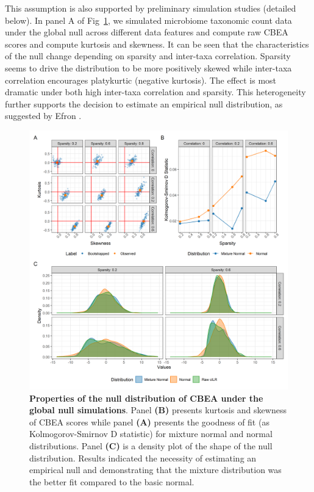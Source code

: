 \documentclass[10pt,letterpaper]{article}
\begin{document}
This assumption is also supported by preliminary simulation studies (detailed below). In panel A of Fig~\ref{fig:1}, we simulated microbiome taxonomic count data under the global null across different data features and compute raw CBEA scores and compute kurtosis and skewness. It can be seen that the characteristics of the null change depending on sparsity and inter-taxa correlation. Sparsity seems to drive the distribution to be more positively skewed while inter-taxa correlation encourages platykurtic (negative kurtosis). The effect is most dramatic under both high inter-taxa correlation and sparsity. This heterogeneity further supports the decision to estimate an empirical null distribution, as suggested by Efron \cite{efron2004}. 

\begin{figure} [!h]
    \centering
    \includegraphics[width=\linewidth]{figures/kurtosis_skewness_gof.png}
    \caption{{\bf Properties of the null distribution of CBEA under the global null simulations}. Panel \textbf{(B)} presents kurtosis and skewness of CBEA scores while panel \textbf{(A)} presents the goodness of fit (as Kolmogorov-Smirnov D statistic) for mixture normal and normal distributions. Panel \textbf{(C)} is a density plot of the shape of the null distribution. Results indicated the necessity of estimating an empirical null and demonstrating that the mixture distribution was the better fit compared to the basic normal.}
    \label{fig:1}
\end{figure}
\end{document}
